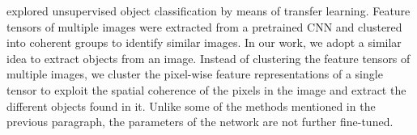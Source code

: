 \textcite{guerin2018unsupervised} explored unsupervised object classification by means of transfer learning. Feature tensors of multiple images were extracted from a pretrained CNN and clustered into coherent groups to identify similar images.
In our work, we adopt a similar idea to extract objects from an image. Instead of clustering the feature tensors of multiple images, we cluster the pixel-wise feature representations of a single tensor to exploit the spatial coherence of the pixels in the image and extract the different objects found in it. Unlike some of the methods mentioned in the previous paragraph, the parameters of the network are not further fine-tuned.